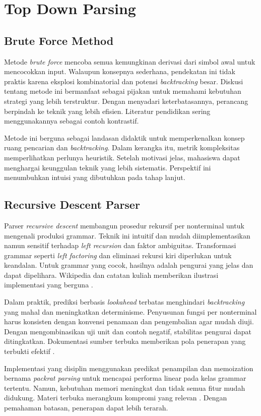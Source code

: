 \documentclass[../main.tex]{subfiles}
\begin{document}
\section{Top Down Parsing}
\subsection{Brute Force Method}
Metode \emph{brute force} mencoba semua kemungkinan derivasi dari simbol awal untuk mencocokkan input. Walaupun konsepnya sederhana, pendekatan ini tidak praktis karena eksplosi kombinatorial dan potensi \emph{backtracking} besar. Diskusi tentang metode ini bermanfaat sebagai pijakan untuk memahami kebutuhan strategi yang lebih terstruktur. Dengan menyadari keterbatasannya, perancang berpindah ke teknik yang lebih efisien. Literatur pendidikan sering menggunakannya sebagai contoh kontrastif.

Metode ini berguna sebagai landasan didaktik untuk memperkenalkan konsep ruang pencarian dan \emph{backtracking}. Dalam kerangka itu, metrik kompleksitas memperlihatkan perlunya heuristik. Setelah motivasi jelas, mahasiswa dapat menghargai keunggulan teknik yang lebih sistematis. Perspektif ini menumbuhkan intuisi yang dibutuhkan pada tahap lanjut.

\subsection{Recursive Descent Parser}
Parser \emph{recursive descent} membangun prosedur rekursif per nonterminal untuk mengenali produksi grammar. Teknik ini intuitif dan mudah diimplementasikan namun sensitif terhadap \emph{left recursion} dan faktor ambiguitas. Transformasi grammar seperti \emph{left factoring} dan eliminasi rekursi kiri diperlukan untuk keandalan. Untuk grammar yang cocok, hasilnya adalah pengurai yang jelas dan dapat dipelihara. Wikipedia dan catatan kuliah memberikan ilustrasi implementasi yang berguna \citep{WikiRecursiveDescent,CS143}.

Dalam praktik, prediksi berbasis \emph{lookahead} terbatas menghindari \emph{backtracking} yang mahal dan meningkatkan determinisme. Penyusunan fungsi per nonterminal harus konsisten dengan konvensi penamaan dan pengembalian agar mudah diuji. Dengan mengombinasikan uji unit dan contoh negatif, stabilitas pengurai dapat ditingkatkan. Dokumentasi sumber terbuka memberikan pola penerapan yang terbukti efektif \citep{CS143}.

Implementasi yang disiplin menggunakan predikat penampilan dan memoization bernama \emph{packrat parsing} untuk mencapai performa linear pada kelas grammar tertentu. Namun, kebutuhan memori meningkat dan tidak semua fitur mudah didukung. Materi terbuka merangkum kompromi yang relevan \citep{CS143}. Dengan pemahaman batasan, penerapan dapat lebih terarah.
\end{document}
